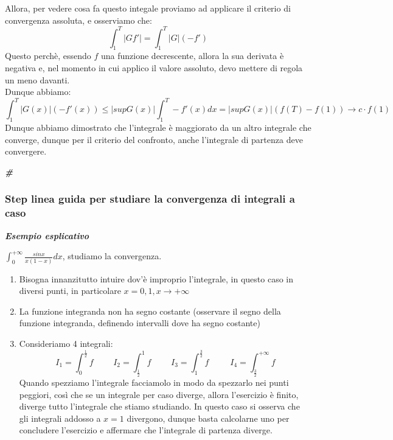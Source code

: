 \documentclass{article}
\theoremstyle{definition}
\newcommand{\cvd}{\begin{center} \textbf{\textit{\#}} \end{center}}
\begin{document}
Allora, per vedere cosa fa questo integale proviamo ad applicare il criterio di convergenza assoluta, e osserviamo che:
\begin{equation*}
    \int_1^T |Gf'|=\int_1^T |G|(-f')
\end{equation*}
Questo perchè, essendo $f$ una funzione decrescente, allora la sua derivata è negativa e, nel momento in cui applico il valore assoluto, devo mettere di regola un meno davanti.
\\
Dunque abbiamo:
\begin{equation*}
    \int_1^T |G(x)|(-f'(x)) \leqslant |supG(x)|\int_1^T -f'(x) dx= |supG(x)| (f(T)-f(1)) \to c \cdot f(1)
\end{equation*}
Dunque abbiamo dimostrato che l'integrale è maggiorato da un altro integrale che converge, dunque per il criterio del confronto, anche l'integrale di partenza deve convergere. \\
\cvd

\subsubsection{Step linea guida per studiare la convergenza di integrali a caso}
\begin{center}
    \textbf{\textit{Esempio esplicativo}}
\end{center}
$\int_0^{+\infty}\frac{sinx}{x(1-x)}dx$, studiamo la convergenza.
\begin{enumerate}
    \item Bisogna innanzitutto intuire dov'è improprio l'integrale, in questo caso in diversi punti, in particolare $x=0,1, x \to +\infty$
    \item La funzione integranda non ha segno costante (osservare il segno della funzione integranda, definendo intervalli dove ha segno costante)
    \item Consideriamo 4 integrali:
    \begin{equation*}
        I_1=\int_0^\frac{1}{2}f \,\,\,\,\,\,\,\,\,\,\,\,\,\, I_2=\int_{\frac{1}{2}}^1 f \,\,\,\,\,\,\,\,\,\,\,\,\,\, I_3=\int_1^{\frac{3}{2}}f \,\,\,\,\,\,\,\,\,\,\,\,\,\,\, I_4= \int_{\frac{3}{2}}^{+\infty}f
    \end{equation*}
    Quando spezziamo l'integrale facciamolo in modo da spezzarlo nei punti peggiori, così che se un integrale per caso diverge, allora l'esercizio è finito, diverge tutto l'integrale che stiamo studiando.
    In questo caso si osserva che gli integrali addosso a $x=1$ divergono, dunque basta calcolarne uno per concludere l'esercizio e affermare che l'integrale di partenza diverge.
\end{enumerate}
\newpage
\end{document}
